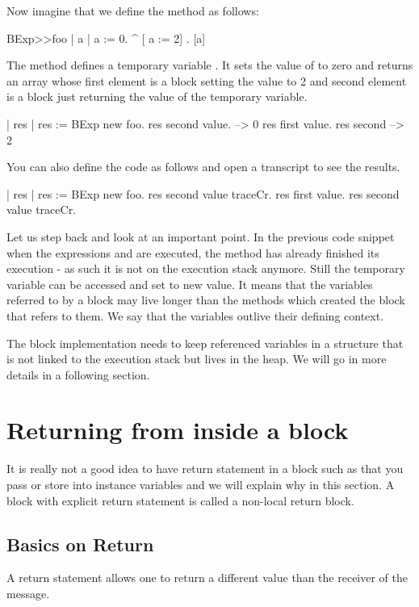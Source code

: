 \documentclass[a4paper,10pt,twoside]{book}
\begin{document}
Now imagine that we define the method  as follows:

\begin{code}{}
BExp>>foo
	| a |
	a := 0. 
	^ {[ a := 2] . [a]} 
\end{code}

The method  defines a temporary variable . It sets the value of 
to zero and returns an array whose first element is a block setting the value to 2 and second element is a block just returning the value of the temporary variable. 

\begin{code}{}
| res | 
res := BExp new foo.
res second value.
     --> 0
res first value.
res second
     --> 2
\end{code}

You can also define the code as follows and open a transcript to see the results.

\begin{code}
| res |
res := BExp new foo.
res second value traceCr.
res first value.
res second value traceCr.
\end{code}

Let us step back and look at an important point. 
In the previous code snippet when the expressions  and  are executed, the method  has already finished its execution - as such it is not on the execution stack anymore.  Still the temporary variable  can be accessed and set to new value. It means that the variables referred to by a block may live longer than the methods which created the block that refers to them. We say that the variables outlive their defining context. 

The block implementation needs to keep referenced variables in a structure that is not linked to the execution stack but lives in the heap. We will go in more details in a following section. 





\section{Returning from inside a block}
It is really not a good idea to have return statement in a block such as \ct{[^ 33]} that you pass or store into instance variables and we will explain why in this section. A block with explicit return statement is called a  non-local return block. 

\subsection{Basics on Return}
A return statement allows one to return a different value than the receiver of the message.
\end{document}
